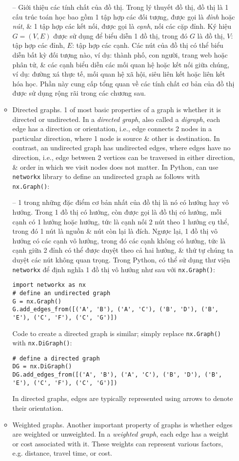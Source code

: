 \documentclass{article}
\begin{document}
\begin{itemize}
\begin{itemize}
        -- {\sf Giới thiệu các tính chất của đồ thị.} Trong lý thuyết đồ thị, đồ thị là 1 cấu trúc toán học bao gồm 1 tập hợp các đối tượng, được gọi là {\it đỉnh} hoặc {\it nút}, \& 1 tập hợp các kết nối, được gọi là {\it cạnh}, nối các cặp đỉnh. Ký hiệu $G = (V,E)$ được sử dụng để biểu diễn 1 đồ thị, trong đó $G$ là đồ thị, $V$: tập hợp các đỉnh, $E$: tập hợp các cạnh. Các nút của đồ thị có thể biểu diễn bất kỳ đối tượng nào, ví dụ: thành phố, con người, trang web hoặc phân tử, \& các cạnh biểu diễn các mối quan hệ hoặc kết nối giữa chúng, ví dụ: đường xá thực tế, mối quan hệ xã hội, siêu liên kết hoặc liên kết hóa học. Phần này cung cấp tổng quan về các tính chất cơ bản của đồ thị được sử dụng rộng rãi trong các chương sau.
        \item {\sf Directed graphs.} 1 of most basic properties of a graph is whether it is directed or undirected. In a {\it directed graph}, also called a {\it digraph}, each edge has a direction or orientation, i.e., edge connects 2 nodes in a particular direction, where 1 node is source \& other is destination. In contrast, an undirected graph has undirected edges, where edges have no direction, i.e., edge between 2 vertices can be traversed in either direction, \& order in which we visit nodes does not matter. In Python, can use {\tt networkx} library to define an undirected graph as follows with {\tt nx.Graph()}:

        -- 1 trong những đặc điểm cơ bản nhất của đồ thị là nó có hướng hay vô hướng. Trong 1 đồ thị có hướng, còn được gọi là đồ thị có hướng, mỗi cạnh có 1 hướng hoặc hướng, tức là cạnh nối 2 nút theo 1 hướng cụ thể, trong đó 1 nút là nguồn \& nút còn lại là đích. Ngược lại, 1 đồ thị vô hướng có các cạnh vô hướng, trong đó các cạnh không có hướng, tức là cạnh giữa 2 đỉnh có thể được duyệt theo cả hai hướng, \& thứ tự chúng ta duyệt các nút không quan trọng. Trong Python, có thể sử dụng thư viện {\tt networkx} để định nghĩa 1 đồ thị vô hướng như sau với {\tt nx.Graph()}:
        \begin{verbatim}
import networkx as nx
# define an undirected graph
G = nx.Graph()
G.add_edges_from([('A', 'B'), ('A', 'C'), ('B', 'D'), ('B', 'E'), ('C', 'F'), ('C', 'G')])
        \end{verbatim}
        Code to create a directed graph is similar; simply replace {\tt nx.Graph()} with {\tt nx.DiGraph()}:
        \begin{verbatim}
# define a directed graph
DG = nx.DiGraph()
DG.add_edges_from([('A', 'B'), ('A', 'C'), ('B', 'D'), ('B', 'E'), ('C', 'F'), ('C', 'G')])
        \end{verbatim}
        In directed graphs, edges are typically represented using arrows to denote their orientation.
        \item {\sf Weighted graphs.} Another important property of graphs is whether edges are weighted or unweighted. In a {\it weighted graph}, each edge has a weight or cost associated with it. These weights can represent various factors, e.g. distance, travel time, or cost.


\end{itemize}
\end{itemize}
\end{document}
